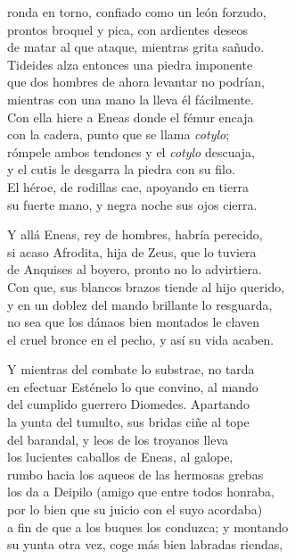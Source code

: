 \documentclass[11pt,twoside]{article}
\begin{document}
ronda en torno, confiado como un león forzudo,\\
prontos broquel y pica, con ardientes deseos\\
de matar al que ataque, mientras grita sañudo.\\
Tideides alza entonces una piedra imponente\\
que dos hombres de ahora levantar no podrían,\\
mientras con una mano la lleva él fácilmente.\\
Con ella hiere a Eneas donde el fémur encaja\\
con la cadera, punto que se llama \emph{cotylo};\\
rómpele ambos tendones y el \emph{cotylo} descuaja,\\
y el cutis le desgarra la piedra con su filo.\\
El héroe, de rodillas cae, apoyando en tierra\\
su fuerte mano, y negra noche sus ojos cierra.\par
Y allá Eneas, rey de hombres, habría perecido,\\
si acaso Afrodita, hija de Zeus, que lo tuviera\\
de Anquises al boyero, pronto no lo advirtiera.\\
Con que, sus blancos brazos tiende al hijo querido,\\
y en un doblez del mando brillante lo resguarda,\\
no sea que los dánaos bien montados le claven\\
el cruel bronce en el pecho, y así su vida acaben.\par
Y mientras del combate lo substrae, no tarda\\
en efectuar Esténelo lo que convino, al mando\\
del cumplido guerrero Diomedes. Apartando\\
la yunta del tumulto, sus bridas ciñe al tope\\
del barandal, y leos de los troyanos lleva\\
los lucientes caballos de Eneas, al galope,\\
rumbo hacia los aqueos de las hermosas grebas\\
los da a Deipilo (amigo que entre todos honraba,\\
por lo bien que su juicio con el suyo acordaba)\\
a fin de que a los buques los conduzca; y montando\\
su yunta otra vez, coge más bien labradas riendas,\\
\end{document}
